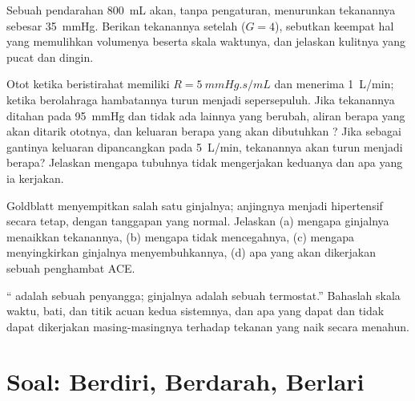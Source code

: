 \begin{exercise}[$\star\star$]\label{exo:b2:blood-pressure:9}
Sebuah pendarahan \qty{800}{mL} akan, tanpa pengaturan, menurunkan
tekanannya sebesar \qty{35}{mmHg}. Berikan tekanannya setelah
 ($G = 4$), sebutkan keempat hal yang memulihkan
volumenya beserta skala waktunya, dan jelaskan kulitnya yang pucat dan
dingin.
\end{exercise}

\begin{exercise}[$\star\star\star$]\label{exo:b2:blood-pressure:10}
Otot ketika beristirahat memiliki $R = \qty{5}{mmHg.s/mL}$ dan menerima
\qty{1}{L/min}; ketika berolahraga hambatannya turun menjadi
sepersepuluh. Jika tekanannya ditahan pada \qty{95}{mmHg} dan tidak ada
lainnya yang berubah, aliran berapa yang akan ditarik ototnya, dan
keluaran berapa yang akan dibutuhkan ? Jika sebagai gantinya
keluaran  dipancangkan pada \qty{5}{L/min}, tekanannya akan
turun menjadi berapa? Jelaskan mengapa tubuhnya tidak mengerjakan
keduanya dan apa yang ia kerjakan.
\end{exercise}

\begin{exercise}[$\star\star\star$]\label{exo:b2:blood-pressure:11}
Goldblatt menyempitkan salah satu  ginjalnya; anjingnya menjadi
hipertensif secara tetap, dengan tanggapan  yang normal.
Jelaskan (a) mengapa ginjalnya menaikkan tekanannya, (b) mengapa
 tidak mencegahnya, (c) mengapa menyingkirkan ginjalnya
menyembuhkannya, (d) apa yang akan dikerjakan sebuah penghambat ACE.
\end{exercise}

\begin{exercise}[$\star\star\star$]\label{exo:b2:blood-pressure:12}
`` adalah sebuah penyangga; ginjalnya adalah sebuah
termostat.'' Bahaslah skala waktu, bati, dan titik acuan kedua
sistemnya, dan apa yang dapat dan tidak dapat dikerjakan
masing-masingnya terhadap tekanan yang naik secara menahun.
\end{exercise}

\section{Soal: Berdiri, Berdarah, Berlari}

